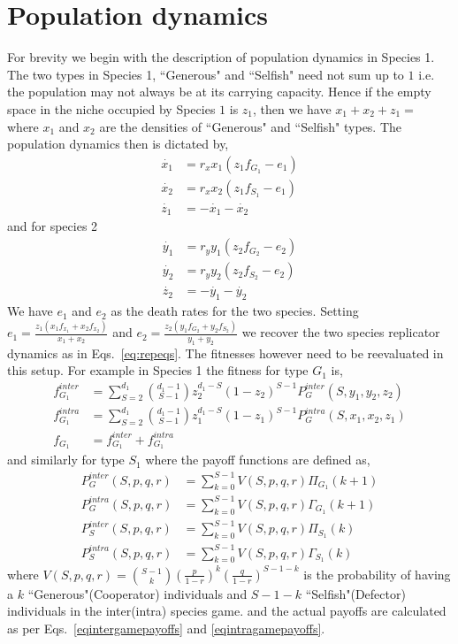 \documentclass[12pt]{article}
\begin{document}
\section*{Population dynamics}

For brevity we begin with the description of population dynamics in Species 1.
The two types in Species 1, ``Generous" and ``Selfish" need not sum up to $1$ i.e. the population may not always be at its carrying capacity.
Hence if the empty space in the niche occupied by Species $1$ is $z_1$, then we have $x_1 + x_2 + z_1 = $ where $x_1$ and $x_2$ are the densities of ``Generous" and ``Selfish" types.
The population dynamics then is dictated by,
%
\begin{align}
	\dot{x_1} &= r_x x_1 (z_1 f_{G_1} - e_1) \\
	\dot{x_2} &= r_x x_2 (z_1 f_{S_1} - e_1) \\
	\dot{z_1} &= - \dot{x_1} - \dot{x_2}
\end{align}
%
and for species 2
\begin{align}
	\dot{y_1} &= r_y y_1 (z_2 f_{G_2} - e_2) \\
	\dot{y_2} &= r_y y_2 (z_2 f_{S_2} - e_2) \\
	\dot{z_2} &= - \dot{y_1} - \dot{y_2}
\end{align}
%
We have $e_1$ and $e_2$ as the death rates for the two species.
Setting $e_1 = \frac{z_1 (x_1 f_{x_1} + x_2 f_{x_2}) }{x_1 + x_2}$ and $e_2 = \frac{z_2 (y_1 f_{G_2} + y_2 f_{S_2}) }{y_1 + y_2}$ we recover the two species replicator dynamics as in Eqs.~\ref{eq:repeqs}.
The fitnesses however need to be reevaluated in this setup.
For example in Species 1 the fitness for type $G_1$ is,
%
\begin{align}
	f_{G_1}^{inter} &= \sum_{S=2}^{d_1} \binom{d_1 -1}{S-1} z_2 ^{d_1 -S} (1-z_2)^{S-1} P_G^{inter}(S,y_1,y_2,z_2) \\
	f_{G_1}^{intra} &= \sum_{S=2}^{d_1} \binom{d_1 -1}{S-1} z_1 ^{d_1 -S} (1-z_1)^{S-1} P_G^{intra}(S,x_1,x_2,z_1) \\
	f_{G_1} &= f_{G_1}^{inter} + f_{G_1}^{intra}
\end{align}
%
and similarly for type $S_1$ where the payoff functions are defined as,
%
\begin{align}
	P_G^{inter}(S,p,q,r) &= \sum_{k=0}^{S-1} V(S,p,q,r) \Pi_{G_1}(k+1) \\
	P_G^{intra}(S,p,q,r) &= \sum_{k=0}^{S-1} V(S,p,q,r) \Gamma_{G_1}(k+1) \\
	P_S^{inter}(S,p,q,r) &= \sum_{k=0}^{S-1} V(S,p,q,r) \Pi_{S_1}(k) \\
	P_S^{intra}(S,p,q,r) &= \sum_{k=0}^{S-1} V(S,p,q,r) \Gamma_{S_1}(k)
\end{align}
%
where $V(S,p,q,r) = \binom{S-1}{k} \left( \frac{p}{1-r}\right)^k  \left(\frac{q}{1-r}\right)^{S-1-k}$ is the probability of having a $k$ ``Generous"(Cooperator) individuals and $S-1-k$ ``Selfish"(Defector) individuals in the inter(intra) species game.
and the actual payoffs are calculated as per Eqs.~\ref{eqintergamepayoffs} and \ref{eqintragamepayoffs}.
\end{document}
